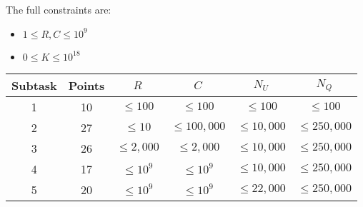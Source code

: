 The full constraints are:
\begin{itemize}
\item $1 \leq R, C \leq 10^9$
\item $0 \leq K \leq 10^{18}$
\end{itemize}
\begin{center}
\begin{tabular}{ |c|c|c|c|c|c| }
\hline
Subtask & Points & $R$ & $C$ & $N_U$ & $N_Q$\\
\hline
1 & 10 & $\leq 100$ & $\leq 100$ & $\leq 100$ & $\leq 100$\\
\hline
2 & 27 & $\leq 10$ & $\leq 100,000$ & $\leq 10,000$ & $\leq 250,000$\\
\hline
3 & 26 & $\leq 2,000$ & $\leq 2,000$ & $\leq 10,000$ & $\leq 250,000$\\
\hline
4 & 17 & $\leq 10^9$ & $\leq 10^9$ & $\leq 10,000$ & $\leq 250,000$\\
\hline
5 & 20 & $\leq 10^9$ & $\leq 10^9$ & $\leq 22,000$ & $\leq 250,000$\\
\hline
\end{tabular}
\end{center}


